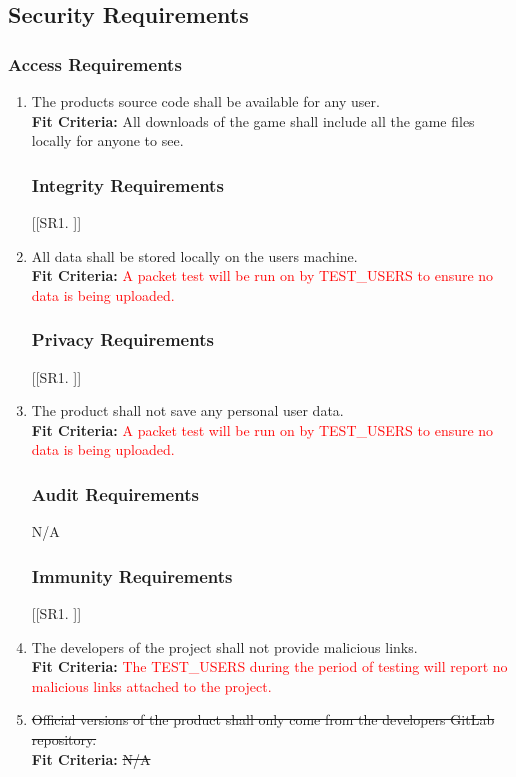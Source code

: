 \documentclass[12pt, titlepage]{article}
\begin{document}
\subsection{Security Requirements}

\subsubsection{Access Requirements}
\begin{enumerate}[{SR}1. ]
    \item The products source code shall be available for any user.\\
    \textbf{Fit Criteria:} All downloads of the game shall include all the game files locally for anyone to see.

\subsubsection{Integrity Requirements}
[{[{SR}1. ]}]
    \item All data shall be stored locally on the users machine.\\
    \textbf{Fit Criteria:} \textcolor{red}{A packet test will be run on by TEST\_USERS to ensure no data is being uploaded.}

\subsubsection{Privacy Requirements}
[{[{SR}1. ]}]
    \item The product shall not save any personal user data.\\
    \textbf{Fit Criteria:}  \textcolor{red}{A packet test will be run on by TEST\_USERS to ensure no data is being uploaded.}

\subsubsection{Audit Requirements}
N/A

\subsubsection{Immunity Requirements}
[{[{SR}1. ]}]
    \item The developers of the project shall not provide malicious links.\\
    \textbf{Fit Criteria:} \textcolor{red}{The TEST\_USERS during the period of testing will report no malicious links attached to the project.}
    \item \sout{Official versions of the product shall only come from the developers GitLab repository.}\\
    \textbf{Fit Criteria:} \sout{N/A}
\end{enumerate}
\end{document}
